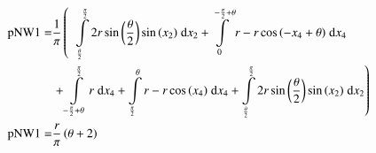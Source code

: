 \begin{align}
    \mathrm{pNW1} =&\frac{1}{\pi} \left(\;\;\int\limits_{\frac{\theta}{2}}^{\frac{\pi}{2}}2 r \sin{\left (\frac{\theta}{2} \right )} \sin{\left (x_{2} \right )}\;\mathrm{d}x_{2}+\int\limits_{0}^{- \frac{\pi}{2} + \theta}r - r \cos{\left (- x_{4} + \theta \right )}\;\mathrm{d}x_{4}\right.\notag\\
 &\left.+\int\limits_{- \frac{\pi}{2} + \theta}^{\frac{\pi}{2}}r\;\mathrm{d}x_{4}+\int\limits_{\frac{\pi}{2}}^{\theta}r - r \cos{\left (x_{4} \right )}\;\mathrm{d}x_{4}+\int\limits_{\frac{\theta}{2}}^{\frac{\pi}{2}}2 r \sin{\left (\frac{\theta}{2} \right )} \sin{\left (x_{2} \right )}\;\mathrm{d}x_{2}\right)\label{pNW1Def}\\
    \mathrm{pNW1} =& \frac{r}{\pi} \left(\theta + 2\right)\label{pNW1Sln}
\end{align}